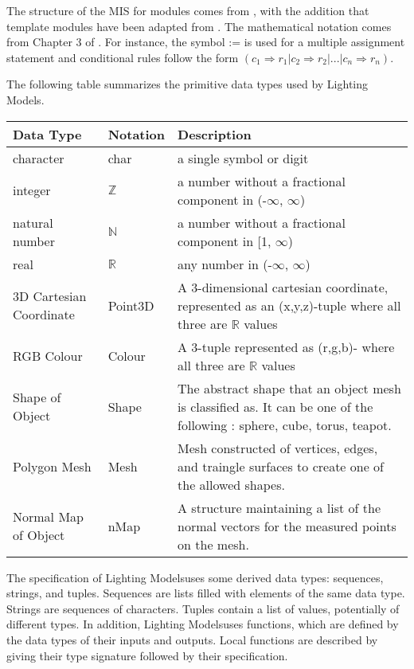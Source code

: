 \documentclass[12pt, titlepage]{article}
\newcommand{\progname}{Lighting Models}
\begin{document}

The structure of the MIS for modules comes from \citet{HoffmanAndStrooper1995},
with the addition that template modules have been adapted from
\cite{GhezziEtAl2003}.  The mathematical notation comes from Chapter 3 of
\citet{HoffmanAndStrooper1995}.  For instance, the symbol := is used for a
multiple assignment statement and conditional rules follow the form $(c_1
\Rightarrow r_1 | c_2 \Rightarrow r_2 | ... | c_n \Rightarrow r_n )$.

The following table summarizes the primitive data types used by \progname. 

\begin{center}
\renewcommand{\arraystretch}{1.2}
\noindent 
\begin{tabular}{l l p{7.5cm}} 
\toprule 
\textbf{Data Type} & \textbf{Notation} & \textbf{Description}\\ 
\midrule
character & char & a single symbol or digit\\
integer & $\mathbb{Z}$ & a number without a fractional component in (-$\infty$, $\infty$) \\
natural number & $\mathbb{N}$ & a number without a fractional component in [1, $\infty$) \\
real & $\mathbb{R}$ & any number in (-$\infty$, $\infty$)\\
3D Cartesian Coordinate & Point3D &  A 3-dimensional cartesian coordinate, 
represented as an (x,y,z)-tuple where all three are $\mathbb{R}$ values\\
RGB Colour & Colour &  A 3-tuple represented as (r,g,b)- where all three are 
$\mathbb{R}$ values\\
Shape of Object & Shape & The abstract shape that an object mesh is classified 
as. It can be one of the following : sphere, cube, torus, teapot. \\
Polygon Mesh & Mesh & Mesh constructed of vertices, edges, and traingle 
surfaces to create one of the allowed shapes.\\
Normal Map of Object & nMap & A structure maintaining a list of the normal 
vectors for the measured points on the mesh. \\
\bottomrule
\end{tabular} 
\end{center}

\noindent
The specification of \progname uses some derived data types: sequences, 
strings, and tuples. Sequences are lists filled with elements of the same data 
type. Strings
are sequences of characters. Tuples contain a list of values, potentially of
different types. In addition, \progname uses functions, which
are defined by the data types of their inputs and outputs. Local functions are
described by giving their type signature followed by their specification.
\end{document}
